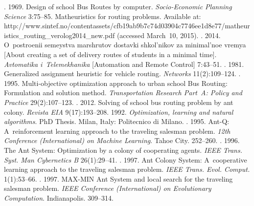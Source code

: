 \begin{multicols}{2}
{{\begin{thebibliography}{99}
. 1969. Design of school Bus Routes by
computer. \textit{Socio-Economic Planning Science} 3:75--85.
 Matheuristics for routing problems. Available at: {\sf
http://www.sintef.no/contentassets/cfb19ab9\linebreak b7c74d03904c7746ee1d8e77/matheuristics\_routing\_\linebreak verolog2014\_new.pdf} (accessed March~10, 2015).
. 2014.
O~postroenii semeystva marshrutov dostavki shkol'nikov za minimal'noe vremya
[About creating a set of delivery routes of students in a minimal time].
\textit{Avtomatika i~Telemekhanika} [Automation and Remote Control] 7:43--51.
. 1981. Generalized assignment heuristic
for vehicle routing. \textit{Networks} 11(2):109--124.
. 1995. Multi-objective
optimization approach to urban school Bus Routing: Formulation and solution
method. \textit{Transportation Research Part~A: Policy and Practice}
29(2):107--123.
. 2012. Solving
of school bus routing problem by ant colony. \textit{Revista EIA} 9(17):193--208.
 1992. \textit{Optimization, learning and natural algorithms}. PhD
Thesis. Milan, Italy: Politecnico di Milano.
. 1995. Ant-Q: A~reinforcement learning
approach to the traveling salesman problem. \textit{12th Conference (International)
on Machine Learning}. Tahoe City. 252--260.
. 1996. The Ant System:
Optimization by a colony of cooperating agents. \textit{IEEE Trans. Syst. Man
Cybernetics B} 26(1):29--41.
. 1997. Ant Colony System:
A~cooperative learning approach to the traveling salesman problem. \textit{IEEE
Trans. Evol. Comput.} 1(1):53--66.
. 1997. MAX-MIN Ant System
and local search for the traveling salesman problem. \textit{IEEE Conference
(International) on Evolutionary Computation}. Indianapolis. 309--314.


\end{thebibliography}}}
\end{multicols}
